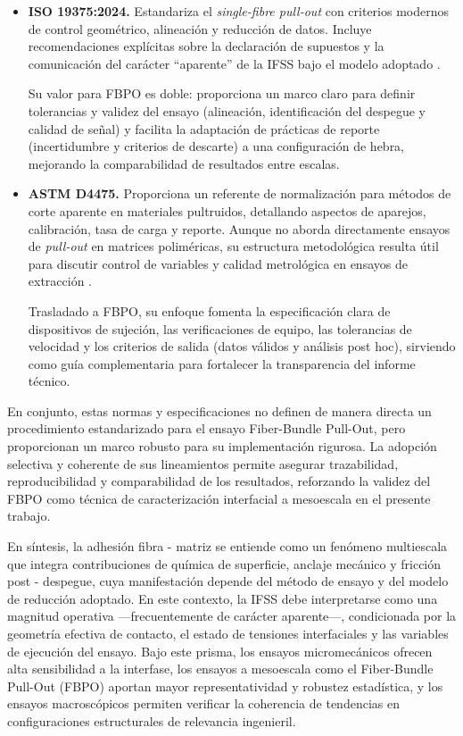 \begin{itemize}
    \item \textbf{ISO 19375:2024.} Estandariza el \textit{single-fibre pull-out} con criterios modernos
    de control geométrico, alineación y reducción de datos. Incluye recomendaciones explícitas sobre
    la declaración de supuestos y la comunicación del carácter ``aparente'' de la IFSS bajo el modelo
    adoptado \cite{ISO19375}. 

    Su valor para FBPO es doble: proporciona un marco claro para definir tolerancias y validez del
    ensayo (alineación, identificación del despegue y calidad de señal) y facilita la adaptación de
    prácticas de reporte (incertidumbre y criterios de descarte) a una configuración de hebra,
    mejorando la comparabilidad de resultados entre escalas.

    \item \textbf{ASTM D4475.} Proporciona un referente de normalización para métodos de corte aparente
    en materiales pultruidos, detallando aspectos de aparejos, calibración, tasa de carga y reporte.
    Aunque no aborda directamente ensayos de \textit{pull-out} en matrices poliméricas, su estructura
    metodológica resulta útil para discutir control de variables y calidad metrológica en ensayos de
    extracción \cite{ASTMD4475}. 

    Trasladado a FBPO, su enfoque fomenta la especificación clara de dispositivos de sujeción, las
    verificaciones de equipo, las tolerancias de velocidad y los criterios de salida (datos válidos y
    análisis post hoc), sirviendo como guía complementaria para fortalecer la transparencia del
    informe técnico.
\end{itemize}

\noindent
En conjunto, estas normas y especificaciones no definen de manera directa un procedimiento
estandarizado para el ensayo Fiber-Bundle Pull-Out, pero proporcionan un marco robusto para su
implementación rigurosa. La adopción selectiva y coherente de sus lineamientos permite asegurar
trazabilidad, reproducibilidad y comparabilidad de los resultados, reforzando la validez del FBPO
como técnica de caracterización interfacial a mesoescala en el presente trabajo.

En síntesis, la adhesión fibra - matriz se entiende como un fenómeno multiescala que integra
contribuciones de química de superficie, anclaje mecánico y fricción post - despegue, cuya
manifestación depende del método de ensayo y del modelo de reducción adoptado. En este contexto,
la IFSS debe interpretarse como una magnitud operativa —frecuentemente de carácter aparente—,
condicionada por la geometría efectiva de contacto, el estado de tensiones interfaciales y las
variables de ejecución del ensayo. Bajo este prisma, los ensayos micromecánicos ofrecen alta
sensibilidad a la interfase, los ensayos a mesoescala como el Fiber-Bundle Pull-Out (FBPO) aportan
mayor representatividad y robustez estadística, y los ensayos macroscópicos permiten verificar la
coherencia de tendencias en configuraciones estructurales de relevancia ingenieril.

